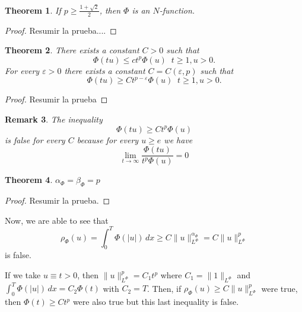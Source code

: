 \documentclass[twoside]{article}
\newtheorem{thm}{Theorem}[section]
\newtheorem{rem}[thm]{Remark}
\theoremstyle{remark}
\newcommand{\orlnor}{\|_{L^{\Phi}}}
\renewcommand{\leq}{\leqslant}
\begin{document}
\begin{thm}
If $p\geq \frac{1+\sqrt 2}{2}$, then $\Phi$ is an $N$-function.
\end{thm}


\begin{proof}
Resumir la prueba....
\end{proof}


\begin{thm}
There exists a constant $C>0$ such that 
\begin{equation}
\Phi(tu)\leq ct^p\Phi(u)\;\;t\geq 1, u>0.
\end{equation}
For every $\varepsilon>0$ there exists a constant $C=C(\varepsilon,p)$ such that
\begin{equation}
\Phi(tu)\geq Ct^{p-\varepsilon}\Phi(u)\;\;t\geq 1,u>0.
\end{equation}
\end{thm}

\begin{proof}
Resumir la prueba
\end{proof}
\begin{rem}
The inequality 
\[
\Phi(tu)\geq Ct^p\Phi(u)
\] is false for every $C$ because for every $u\geq e$ we have 
\[
\lim\limits_{t \to \infty}\frac{\Phi(tu)}{t^p\Phi(u)}=0
\]
\end{rem}

\begin{thm}
$\alpha_{\Phi}=\beta_{\Phi}=p$
\end{thm}

\begin{proof}
Resumir la prueba.
\end{proof}
Now, we are able to see that 
\[
\rho_{\Phi}(u)=\int_0^T \Phi(|u|)\,dx\geq C\|u\orlnor^{\alpha_{\Phi}}=C\|u\orlnor^p
\]
is false.

If we take $u\equiv t>0$, then $\|u\orlnor^p=C_1t^p$ where $C_1=\|1\orlnor$ and
$\int_0^T \Phi(|u|)\,dx=C_2\Phi(t)$ with $C_2=T$. 
Then, if $\rho_{\Phi}(u)\geq C\|u\orlnor^p$ were true, then $\Phi(t)\geq C t^p$ were also true but this
last inequality is false.
 
\end{document}

